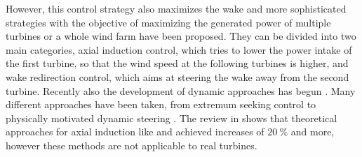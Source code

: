 However, this control strategy also maximizes the wake and more sophisticated strategies with the objective of maximizing the generated power of multiple turbines or a whole wind farm have been proposed. They can be divided into two main categories, axial induction control, which tries to lower the power intake of the first turbine, so that the wind speed at the following turbines is higher, and wake redirection control, which aims at steering the wake away from the second turbine. \cite{boersma_tutorial_2017} Recently also the development of dynamic approaches has begun \cite{frederik_helix_2020}. Many different approaches have been taken, from extremum seeking control \cite{ciri_large-eddy_2017} to physically motivated dynamic steering \cite{frederik_helix_2020}. The review in \cite{kheirabadi_quantitative_2019} shows that theoretical approaches for axial induction like \cite{vali_adjoint-based_2017} and \cite{munters_towards_2018} achieved increases of $\SI{20}{\percent}$ and more, however these methods are not applicable to real turbines.